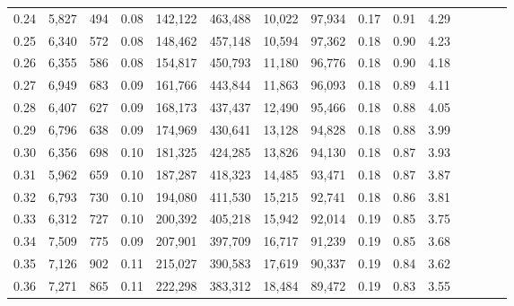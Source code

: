 \begin{tabular}{rrrcrrrrrrrrrrr}
0.24 &   5,827 &    494 &                                       0.08 &  142,122 &  463,488 &   10,022 &   97,934 &  0.17 &  0.91 &                         4.29 \\
0.25 &   6,340 &    572 &                                       0.08 &  148,462 &  457,148 &   10,594 &   97,362 &  0.18 &  0.90 &                         4.23 \\
0.26 &   6,355 &    586 &                                       0.08 &  154,817 &  450,793 &   11,180 &   96,776 &  0.18 &  0.90 &                         4.18 \\
0.27 &   6,949 &    683 &                                       0.09 &  161,766 &  443,844 &   11,863 &   96,093 &  0.18 &  0.89 &                         4.11 \\
0.28 &   6,407 &    627 &                                       0.09 &  168,173 &  437,437 &   12,490 &   95,466 &  0.18 &  0.88 &                         4.05 \\
0.29 &   6,796 &    638 &                                       0.09 &  174,969 &  430,641 &   13,128 &   94,828 &  0.18 &  0.88 &                         3.99 \\
0.30 &   6,356 &    698 &                                       0.10 &  181,325 &  424,285 &   13,826 &   94,130 &  0.18 &  0.87 &                         3.93 \\
0.31 &   5,962 &    659 &                                       0.10 &  187,287 &  418,323 &   14,485 &   93,471 &  0.18 &  0.87 &                         3.87 \\
0.32 &   6,793 &    730 &                                       0.10 &  194,080 &  411,530 &   15,215 &   92,741 &  0.18 &  0.86 &                         3.81 \\
0.33 &   6,312 &    727 &                                       0.10 &  200,392 &  405,218 &   15,942 &   92,014 &  0.19 &  0.85 &                         3.75 \\
0.34 &   7,509 &    775 &                                       0.09 &  207,901 &  397,709 &   16,717 &   91,239 &  0.19 &  0.85 &                         3.68 \\
0.35 &   7,126 &    902 &                                       0.11 &  215,027 &  390,583 &   17,619 &   90,337 &  0.19 &  0.84 &                         3.62 \\
0.36 &   7,271 &    865 &                                       0.11 &  222,298 &  383,312 &   18,484 &   89,472 &  0.19 &  0.83 &                         3.55 \\

\end{tabular}
